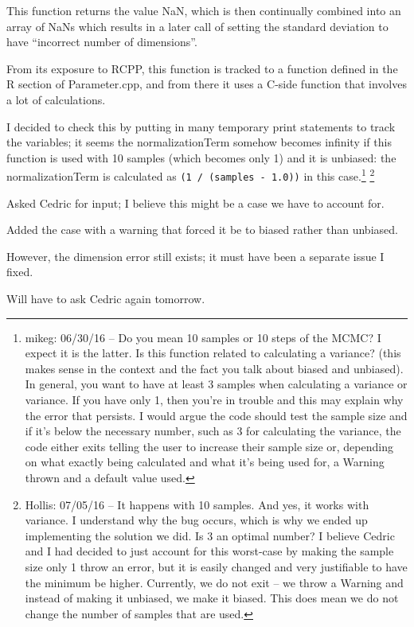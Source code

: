 \documentclass[12pt,hyperref]{labbook}
\begin{document}
This function returns the value NaN, which is then continually combined into an array of NaNs 
which results in a later call of setting the standard deviation to have \enquote{incorrect number
of dimensions}.

From its exposure to RCPP, this function is tracked to a function defined in the R section of
Parameter.cpp, and from there it uses a C-side function that involves a lot of calculations.

I decided to check this by putting in many temporary print statements 
to track the variables; it seems
the normalizationTerm somehow becomes infinity if this function is used with
10 samples (which becomes only 1) and it is unbiased: the normalizationTerm
is calculated as \verb+(1 / (samples - 1.0))+ in this case.\footnote{mikeg: 06/30/16 -- Do you mean 10 samples or 10 steps of the MCMC?  
I expect it is the latter.
Is this function related to calculating a variance? (this makes sense in the context and the fact you talk about biased and unbiased).
In general, you want to have at least 3 samples when calculating a variance or variance.
If you have only 1, then you're in trouble and this may explain why the error that persists.
I would argue the code should test the sample size and if it's below the necessary number, such as 3 for calculating the variance, the code either exits telling the user to increase their sample size or, depending on what exactly being calculated and what it's being used for, a Warning thrown and a default value used.
}
\footnote{Hollis: 07/05/16 -- It happens with 10 samples. 
And yes, it works with variance.
I understand why the bug occurs, which is why we ended up implementing the solution we did.
Is 3 an optimal number?
I believe Cedric and I had decided to just account for this worst-case by making the sample size only 1 throw an error, but it is easily changed and very justifiable to have the minimum be higher.
Currently, we do not exit -- we throw a Warning and instead of making it unbiased, we make it biased.
This does mean we do not change the number of samples that are used.}

Asked Cedric for input; I believe this might be a case we have to account for.

Added the case with a warning that forced it be to biased rather than unbiased.

However, the dimension error still exists; it must have been a separate issue I fixed.

Will have to ask Cedric again tomorrow.
\end{document}
